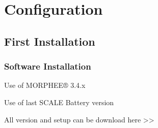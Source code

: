 \documentclass[letterpaper,10pt,english]{jupyterBook}
\begin{document}
\sphinxAtStartPar
{}


\part{Configuration}


\chapter{First Installation}
\label{\detokenize{03_First-Installation:first-installation}}\label{\detokenize{03_First-Installation::doc}}

\section{Software Installation}
\label{\detokenize{03_First-Installation:software-installation}}
\sphinxAtStartPar
Use of MORPHEE® 3.4.x

\sphinxAtStartPar
Use of last SCALE Battery version

\sphinxAtStartPar
All version and setup can be download here >> 
\end{document}
